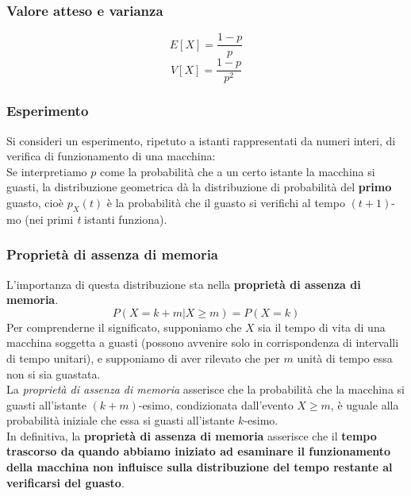 \subsubsection{Valore atteso e varianza}
\begin{equation}
	E[X] = \frac{1-p}{p}	
\end{equation}
\begin{equation}
	V[X] = \frac{1-p}{p^2}
\end{equation}

\subsubsection{Esperimento}
Si consideri un esperimento, ripetuto a istanti rappresentati da numeri interi, di verifica di funzionamento di una macchina: \\
Se interpretiamo $p$ come la probabilità che a un certo istante la macchina si guasti, la distribuzione geometrica dà la distribuzione di probabilità del \textbf{primo} guasto, cioè $p_X(t)$ è la probabilità che il guasto si verifichi al tempo $(t + 1)$-mo (nei primi \textit{t} istanti funziona).

\subsubsection{Proprietà di assenza di memoria}
L'importanza di questa distribuzione sta nella \textbf{proprietà di assenza di memoria}.
\begin{equation}
P(X = k + m | X \ge m) = P(X = k)
\end{equation}
Per comprenderne il significato, supponiamo che $X$ sia il tempo di vita di una macchina soggetta a guasti (possono avvenire solo in corrispondenza di intervalli di tempo unitari), e supponiamo di aver rilevato che per $m$ unità di tempo essa non si sia guastata. \\
La \textit{proprietà di assenza di memoria} asserisce che la probabilità che la macchina si guasti all’istante $(k+m)$-esimo, condizionata dall’evento $X \ge m$, è uguale alla probabilità iniziale che essa si guasti all’istante $k$-esimo. \\
In definitiva, la \textbf{proprietà di assenza di memoria} asserisce che il \textbf{tempo trascorso da quando abbiamo iniziato ad esaminare il funzionamento della macchina non influisce sulla distribuzione del tempo restante al verificarsi del guasto}.
